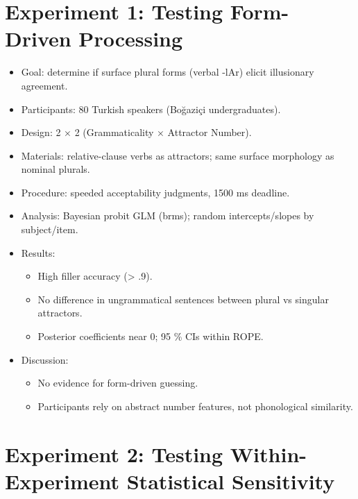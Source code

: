 \documentclass[
  authoryear,
  preprint]{elsarticle}
\providecommand{\tightlist}{%
  \setlength{\itemsep}{0pt}\setlength{\parskip}{0pt}}
\begin{document}
\section{Experiment 1: Testing Form-Driven
Processing}\label{experiment-1-testing-form-driven-processing}

\begin{itemize}
\tightlist
\item
  Goal: determine if surface plural forms (verbal -lAr) elicit
  illusionary agreement.
\item
  Participants: 80 Turkish speakers (Boğaziçi undergraduates).
\item
  Design: 2 × 2 (Grammaticality × Attractor Number).
\item
  Materials: relative-clause verbs as attractors; same surface
  morphology as nominal plurals.
\item
  Procedure: speeded acceptability judgments, 1500 ms deadline.
\item
  Analysis: Bayesian probit GLM (brms); random intercepts/slopes by
  subject/item.
\item
  Results:

  \begin{itemize}
  \tightlist
  \item
    High filler accuracy (\textgreater{} .9).
  \item
    No difference in ungrammatical sentences between plural vs singular
    attractors.
  \item
    Posterior coefficients near 0; 95 \% CIs within ROPE.
  \end{itemize}
\item
  Discussion:

  \begin{itemize}
  \tightlist
  \item
    No evidence for form-driven guessing.
  \item
    Participants rely on abstract number features, not phonological
    similarity.
  \end{itemize}
\end{itemize}

\section{Experiment 2: Testing Within-Experiment Statistical
Sensitivity}\label{experiment-2-testing-within-experiment-statistical-sensitivity}
\end{document}
